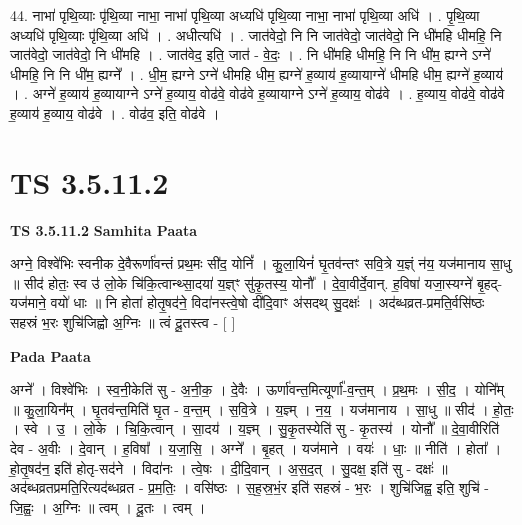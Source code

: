 \documentclass[17pt]{extarticle}
\begin{document}
44. नाभा॑ पृथि॒व्याः पृ॑थि॒व्या नाभा॒ नाभा॑ पृथि॒व्या अध्यधि॑ पृथि॒व्या नाभा॒ नाभा॑ पृथि॒व्या अधि॑ । . पृ॒थि॒व्या अध्यधि॑ पृथि॒व्याः पृ॑थि॒व्या अधि॑ । . अधीत्यधि॑ । . जात॑वेदो॒ नि नि जात॑वेदो॒ जात॑वेदो॒ नि धी॑महि धीमहि॒ नि जात॑वेदो॒ जात॑वेदो॒ नि धी॑महि । . जात॑वेद॒ इति॒ जात॑ - वे॒दः॒ । . नि धी॑महि धीमहि॒ नि नि धी॑म॒ ह्यग्ने ऽग्ने॑ धीमहि॒ नि नि धी॑म॒ ह्यग्ने᳚ । . धी॒म॒ ह्यग्ने ऽग्ने॑ धीमहि धीम॒ ह्यग्ने॑ ह॒व्याय॑ ह॒व्यायाग्ने॑ धीमहि धीम॒ ह्यग्ने॑ ह॒व्याय॑ । . अग्ने॑ ह॒व्याय॑ ह॒व्यायाग्ने ऽग्ने॑ ह॒व्याय॒ वोढ॑वे॒ वोढ॑वे ह॒व्यायाग्ने ऽग्ने॑ ह॒व्याय॒ वोढ॑वे । . ह॒व्याय॒ वोढ॑वे॒ वोढ॑वे ह॒व्याय॑ ह॒व्याय॒ वोढ॑वे । . वोढ॑व॒ इति॒ वोढ॑वे । \newline
\pagebreak
{}

\section{ TS 3.5.11.2 }

\textbf{TS 3.5.11.2 } \newline
\textbf{Samhita Paata} \newline

अग्ने॒ विश्वे॑भिः स्वनीक दे॒वैरूर्णा॑वन्तं प्रथ॒मः सी॑द॒ योनिं᳚ । कु॒ला॒यिनं॑ घृ॒तव॑न्तꣳ सवि॒त्रे य॒ज्ञ्ं न॑य॒ यज॑मानाय सा॒धु ॥ सीद॑ होतः॒ स्व उ॑ लो॒के चि॑कि॒त्वान्थ्सा॒दया॑ य॒ज्ञ्ꣳ सु॑कृ॒तस्य॒ योनौ᳚ । दे॒वा॒वीर्दे॒वान्. ह॒विषा॑ यजा॒स्यग्ने॑ बृ॒हद्-यज॑माने॒ वयो॑ धाः ॥ नि होता॑ होतृ॒षद॑ने॒ विदा॑नस्त्वे॒षो दी॑दि॒वाꣳ अ॑सदथ् सु॒दक्षः॑ । अद॑ब्धव्रत-प्रमति॒र्वसि॑ष्ठः सहस्रं भ॒रः शुचि॑जिह्वो अ॒ग्निः ॥ त्वं दू॒तस्त्व - [  ] \newline

\textbf{Pada Paata} \newline

अग्ने᳚ । विश्वे॑भिः । स्व॒नी॒केति॑ सु - अ॒नी॒क॒ । दे॒वैः । ऊर्णा॑वन्त॒मित्यूर्णा᳚-व॒न्त॒म् । प्र॒थ॒मः । सी॒द॒ । योनि᳚म् ॥ कु॒ला॒यिन᳚म् । घृ॒तव॑न्त॒मिति॑ घृ॒त - व॒न्त॒म् । स॒वि॒त्रे । य॒ज्ञ्म् । न॒य॒ । यज॑मानाय । सा॒धु ॥ सीद॑ । हो॒तः॒ । स्वे । उ॒ । लो॒के । चि॒कि॒त्वान् । सा॒दय॑ । य॒ज्ञ्म् । सु॒कृ॒तस्येति॑ सु - कृ॒तस्य॑ । योनौ᳚ ॥ दे॒वा॒वीरिति॑ देव - अ॒वीः । दे॒वान् । ह॒विषा᳚ । य॒जा॒सि॒ । अग्ने᳚ । बृ॒हत् । यज॑माने । वयः॑ । धाः॒ ॥ नीति॑ । होता᳚ । हो॒तृ॒षद॑न॒ इति॑ होतृ-सद॑ने । विदा॑नः । त्वे॒षः । दी॒दि॒वान् । अ॒स॒द॒त् । सु॒दक्ष॒ इति॑ सु - दक्षः॑ ॥ अद॑ब्धव्रतप्रमति॒रित्यद॑ब्धव्रत - प्र॒म॒तिः॒ । वसि॑ष्ठः । स॒ह॒स्र॒भं॒र इति॑ सहस्रं - भ॒रः । शुचि॑जिह्व॒ इति॒ शुचि॑ - जि॒ह्वः॒ । अ॒ग्निः ॥ त्वम् । दू॒तः । त्वम् ।  \newline
\end{document}
